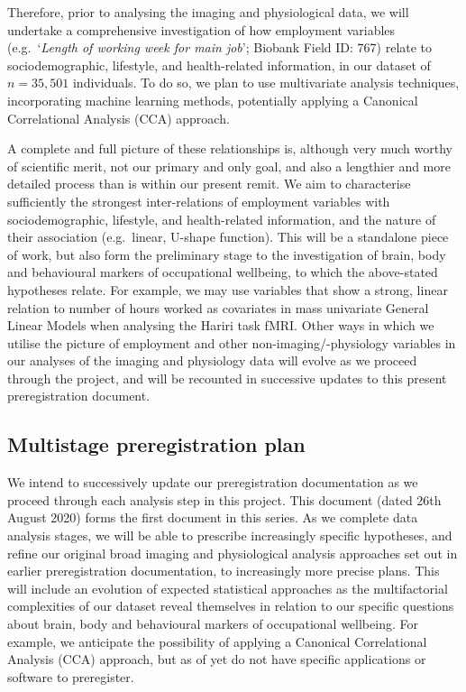 \documentclass[
]{article}
\begin{document}
Therefore, prior to analysing the imaging and physiological data, we
will undertake a comprehensive investigation of how employment variables
(e.g.~`\emph{Length of working week for main job}'; Biobank Field ID:
767) relate to sociodemographic, lifestyle, and health-related
information, in our dataset of \(n=35,501\) individuals. To do so, we
plan to use multivariate analysis techniques, incorporating machine
learning methods, potentially applying a Canonical Correlational
Analysis (CCA) approach.

A complete and full picture of these relationships is, although very
much worthy of scientific merit, not our primary and only goal, and also
a lengthier and more detailed process than is within our present remit.
We aim to characterise sufficiently the strongest inter-relations of
employment variables with sociodemographic, lifestyle, and
health-related information, and the nature of their association
(e.g.~linear, U-shape function). This will be a standalone piece of
work, but also form the preliminary stage to the investigation of brain,
body and behavioural markers of occupational wellbeing, to which the
above-stated hypotheses relate. For example, we may use variables that
show a strong, linear relation to number of hours worked as covariates
in mass univariate General Linear Models when analysing the Hariri task
fMRI. Other ways in which we utilise the picture of employment and other
non-imaging/-physiology variables in our analyses of the imaging and
physiology data will evolve as we proceed through the project, and will
be recounted in successive updates to this present preregistration
document.

\newpage

\hypertarget{multistage-preregistration-plan}{%
\subsection{Multistage preregistration
plan}\label{multistage-preregistration-plan}}

We intend to successively update our preregistration documentation as we
proceed through each analysis step in this project. This document (dated
26th August 2020) forms the first document in this series. As we
complete data analysis stages, we will be able to prescribe increasingly
specific hypotheses, and refine our original broad imaging and
physiological analysis approaches set out in earlier preregistration
documentation, to increasingly more precise plans. This will include an
evolution of expected statistical approaches as the multifactorial
complexities of our dataset reveal themselves in relation to our
specific questions about brain, body and behavioural markers of
occupational wellbeing. For example, we anticipate the possibility of
applying a Canonical Correlational Analysis (CCA) approach, but as of
yet do not have specific applications or software to preregister.
\end{document}
